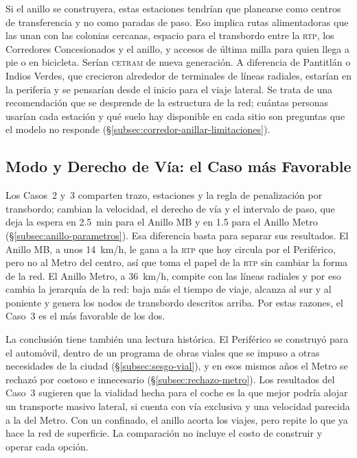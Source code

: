 Si el anillo se construyera, estas estaciones tendrían que planearse como
centros de transferencia y no como paradas de paso. Eso implica rutas
alimentadoras que las unan con las colonias cercanas, espacio para el transbordo
entre la \textsc{rtp}, los Corredores Concesionados y el anillo, y accesos de
última milla para quien llega a pie o en bicicleta. Serían \textsc{cetram} de
nueva generación. A diferencia de Pantitlán o Indios Verdes, que crecieron
alrededor de terminales de líneas radiales, estarían en la periferia y se
pensarían desde el inicio para el viaje lateral. Se trata de una recomendación
que se desprende de la estructura de la red; cuántas personas usarían cada
estación y qué suelo hay disponible en cada sitio son preguntas que el modelo no
responde (§\ref{subsec:corredor-anillar-limitaciones}).

\subsection{Modo y Derecho de Vía: el Caso más Favorable}
\label{subsec:anillo-conclusiones-modo}

Los Casos~2 y~3 comparten trazo, estaciones y la regla de penalización por
transbordo; cambian la velocidad, el derecho de vía y el intervalo de paso, que
deja la espera en 2.5~min para el Anillo MB y en 1.5 para el Anillo Metro
(§\ref{subsec:anillo-parametros}). Esa
diferencia basta para separar sus resultados. El Anillo MB, a unos 14~km/h, le
gana a la \textsc{rtp} que hoy circula por el Periférico, pero no al Metro del
centro, así que toma el papel de la \textsc{rtp} sin cambiar la forma de la red.
El Anillo Metro, a 36~km/h, compite con las líneas radiales y por eso cambia la
jerarquía de la red: baja más el tiempo de viaje, alcanza al sur y al poniente y
genera los nodos de transbordo descritos arriba. Por estas razones, el Caso~3 es
el más favorable de los dos.

La conclusión tiene también una lectura histórica. El Periférico se construyó
para el automóvil, dentro de un programa de obras viales que se impuso a otras
necesidades de la ciudad (§\ref{subsec:sesgo-vial}), y en esos mismos años el
Metro se rechazó por costoso e innecesario (§\ref{subsec:rechazo-metro}). Los
resultados del Caso~3 sugieren que la vialidad hecha para el coche es la que
mejor podría alojar un transporte masivo lateral, si cuenta con vía exclusiva y
una velocidad parecida a la del Metro. Con un \brt{} confinado, el anillo acorta
los viajes, pero repite lo que ya hace la red de superficie. La comparación no
incluye el costo de construir y operar cada opción.

